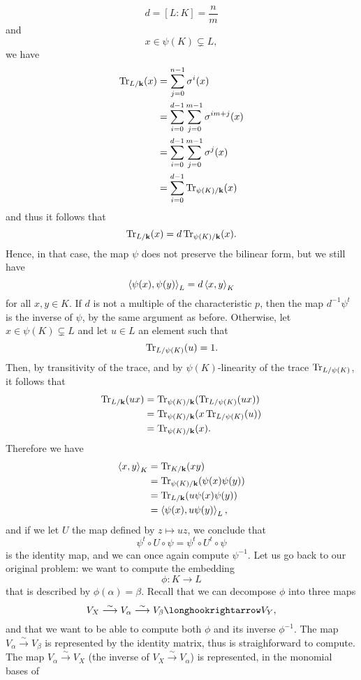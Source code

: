 \[
  d = [L:K] = \frac{n}{m}
\]
and
\[
  x\in \psi(K)\subsetneq L,
\]
we have
\begin{align*}
  \operatorname{Tr}_{L/\mathbf{k}}(x) &= \sum_{j=0}^{n-1}\sigma^i(x) \\
  &= \sum_{i=0}^{d-1}\sum_{j=0}^{m-1}\sigma^{im+j}(x)\\
  &= \sum_{i=0}^{d-1}\sum_{j=0}^{m-1}\sigma^{j}(x)\\
  &= \sum_{i=0}^{d-1}\operatorname{Tr}_{\psi(K)/\mathbf{k}}(x)
\end{align*}
and thus it follows that
\[
  \operatorname{Tr}_{L/\mathbf{k}}(x) = d\operatorname{Tr}_{\psi(K)/\mathbf{k}}(x).
\]
Hence, in that case, the map $\psi$ does not preserve the bilinear form, but we
still have
\[
  \left\langle\psi(x),\psi(y)\right\rangle_L = d\left\langle x,y\right\rangle_K
\]
for all $x, y\in K$. If $d$ is not a multiple of the characteristic $p$, then
the map $d^{-1}\psi^t$ is the inverse of $\psi$, by the same argument as before.
Otherwise, let $x\in\psi(K)\subsetneq L$ and let $u\in L$ an element such that
\[
  \operatorname{Tr}_{L/\psi(K)}(u)=1.
\]
Then, by transitivity of the trace, and by
$\psi(K)$-linearity of the trace $\operatorname{Tr}_{L/\psi(K)}$, it follows that
\begin{align*}
  \operatorname{Tr}_{L/\mathbf{k}}(ux) &= \operatorname{Tr}_{\psi(K)/\mathbf{k}}(\operatorname{Tr}_{L/\psi(K)}(ux)) \\
  &= \operatorname{Tr}_{\psi(K)/\mathbf{k}}(x\operatorname{Tr}_{L/\psi(K)}(u)) \\
  &= \operatorname{Tr}_{\psi(K)/\mathbf{k}}(x).
\end{align*}
Therefore we have
\begin{align*}
  \left\langle x,y\right\rangle_K &= \operatorname{Tr}_{K/\mathbf{k}}(xy) \\
  &= \operatorname{Tr}_{\psi(K)/\mathbf{k}}(\psi(x)\psi(y)) \\
  &= \operatorname{Tr}_{L/\mathbf{k}}(u\psi(x)\psi(y))\\
  &= \left\langle\psi(x),u\psi(y)\right\rangle_L,
\end{align*}
and if we let $U$ the map defined by $z\mapsto uz$, we conclude that
\[
  \psi^t\circ U\circ\psi=\psi^t\circ U^t\circ\psi
\]
is the identity map, and we can once again compute $\psi^{-1}$. Let us go back
to our original problem: we want to compute the embedding
\[
  \phi:K\to L
\]
that is described by $\phi(\alpha) = \beta$. Recall that we can decompose $\phi$
into three maps
\[
  V_X \overset{\sim}{\longrightarrow} V_\alpha \overset{\sim}{\longrightarrow}
  V_\beta \longhookrightarrow V_Y,
\]
and that we want to be able to compute both $\phi$ and its inverse
$\phi^{-1}$. The map $V_\alpha\overset{\sim}{\to}V_\beta$ is represented by the
identity matrix, thus is straighforward to compute. The map
$V_\alpha\overset{\sim}{\to}V_X$ (the inverse of
$V_X\overset{\sim}{\to}V_\alpha$) is represented, in the monomial bases of
